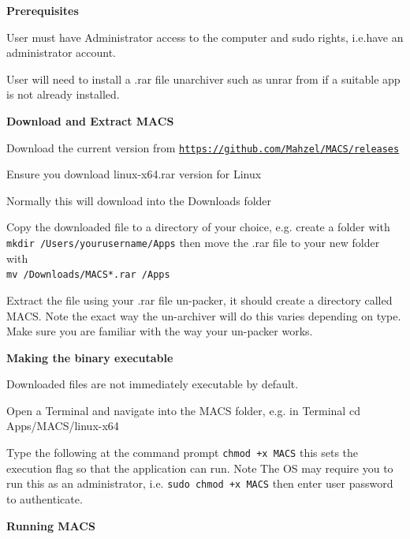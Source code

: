 \textbf{Prerequisites}

\begin{compactitem}
    \item User must have Administrator access to the computer and sudo rights, i.e.have an administrator account.
    \item User will need to install a .rar file unarchiver such as unrar from if a suitable app is not already installed.
\end{compactitem}

\textbf{Download and Extract MACS}

\begin{compactenum}
    \item Download the current version from \href{https://github.com/Mahzel/MACS/releases}{\texttt{https://github.com/Mahzel/MACS/releases}}
    \item Ensure you download linux-x64.rar version for Linux
    \item Normally this will download into the Downloads folder
    \item Copy the downloaded file to a directory of your choice, e.g. create a folder with \\
    \texttt{mkdir /Users/yourusername/Apps} then move the .rar file to your new folder with \\
    \texttt{mv /Downloads/MACS*.rar /Apps}
    \item Extract the file using your .rar file un-packer, it should create a directory called MACS. Note the exact way the un-archiver will do this varies depending on type. Make sure you are familiar with the way your un-packer works.
\end{compactenum}

\textbf{Making the binary executable}

Downloaded files are not immediately executable by default.

\begin{compactenum}
    \item Open a Terminal and navigate into the MACS folder, e.g. in Terminal cd Apps/MACS/linux-x64
    \item Type the following at the command prompt \texttt{chmod +x MACS} this sets the execution flag so that the application can run. Note The OS may require you to run this as an administrator, i.e. \texttt{sudo chmod +x MACS} then enter user password to authenticate.
\end{compactenum}

\textbf{Running MACS}

